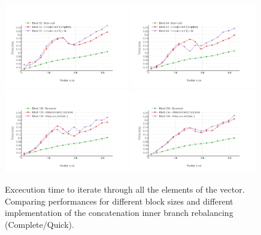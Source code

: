 \begin{figure}[h!]
  \centering
  \label{IterationBlocksBenchmarks}
  \includegraphics[width=0.49\textwidth]{Benchmarks/Iteration_blocks_32.pdf}
  \includegraphics[width=0.49\textwidth]{Benchmarks/Iteration_blocks_64.pdf}
  \includegraphics[width=0.49\textwidth]{Benchmarks/Iteration_blocks_128.pdf}
  \includegraphics[width=0.49\textwidth]{Benchmarks/Iteration_blocks_256.pdf}
  \caption{Excecution time to iterate through all the elements of the vector. Comparing performances for different block sizes and different implementation of the concatenation inner branch rebalancing (Complete/Quick).}
\end{figure}

